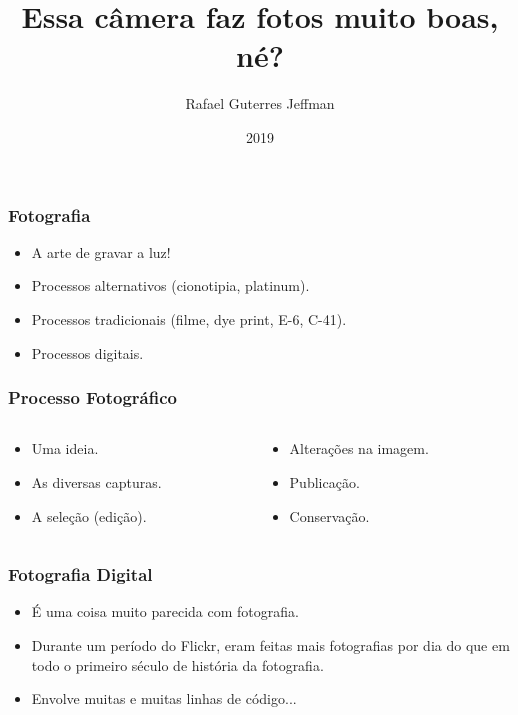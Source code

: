 


\title{Essa câmera faz fotos muito boas, né?}
\subtitle{}
\author{Rafael Guterres Jeffman}
\institute{}
\date{2019}



\coverframe

\begin{frame}
    \frametitle{Fotografia}
    \begin{itemize}
        \item A arte de gravar a luz!
        \item Processos alternativos (cionotipia, platinum).
        \item Processos tradicionais (filme, dye print, E-6, C-41).
        \item Processos digitais.
    \end{itemize}
\end{frame}

\begin{frame}
    \frametitle{Processo Fotográfico}
    \begin{columns}
        \begin{column}{0.4\textwidth}
            \begin{itemize}
                \item Uma ideia.
                \item As diversas capturas.
                \item A seleção (edição).
            \end{itemize}
        \end{column}
        \begin{column}{0.5\textwidth}
            \begin{itemize}
                \item Alterações na imagem.
                \item Publicação.
                \item Conservação.
            \end{itemize}
        \end{column}
    \end{columns}
\end{frame}

\begin{frame}
    \frametitle{Fotografia Digital}
    \begin{itemize}
        \item É uma coisa muito parecida com fotografia.
        \item Durante um período do Flickr, eram feitas mais fotografias por
        dia do que em todo o primeiro século de história da fotografia.
        \vfill
        \item Envolve muitas e muitas linhas de código...
    \end{itemize}
\end{frame}

